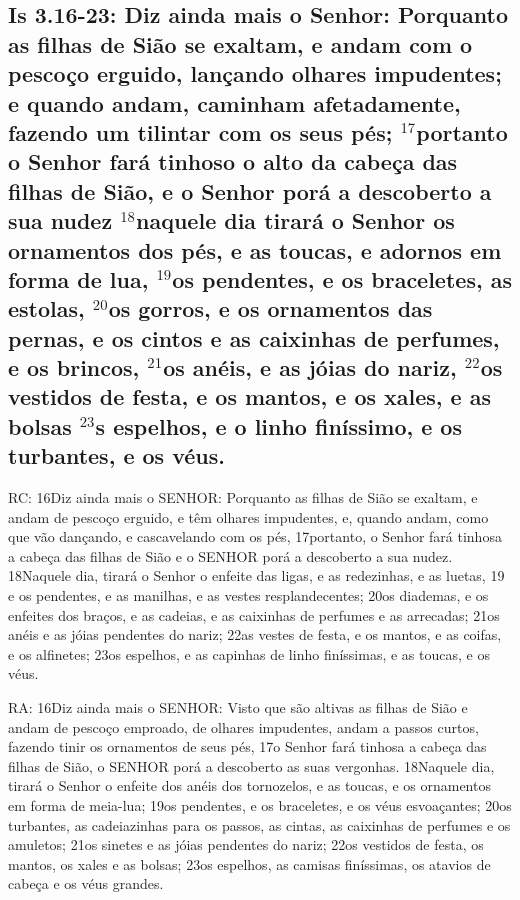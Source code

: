 \subsection{Is 3.16-23: Diz ainda mais o Senhor: Porquanto as filhas de Sião se exaltam, e andam com o pescoço erguido, lançando olhares impudentes; e quando andam, caminham afetadamente, fazendo um tilintar com os seus pés; $^{\mathrm{17}}$portanto o Senhor fará tinhoso o alto da cabeça das filhas de Sião, e o Senhor porá a descoberto a sua nudez\uwave{,} $^{\mathrm{18}}$naquele dia tirará o Senhor os ornamentos dos pés, e as toucas, e adornos em forma de lua, $^{\mathrm{19}}$os pendentes, e os braceletes, as estolas, $^{\mathrm{20}}$os gorros, e os ornamentos das pernas, e os cintos e as caixinhas de perfumes, e os brincos, $^{\mathrm{21}}$os anéis, e as jóias do nariz, $^{\mathrm{22}}$os vestidos de festa, e os mantos, e os xales, e as bolsas $^{\mathrm{23}}$s espelhos, e o linho finíssimo, e os turbantes, e os véus.}

RC: 16Diz ainda mais o SENHOR: Porquanto as filhas de Sião se exaltam, e andam de pescoço erguido, e têm olhares impudentes, e, quando andam, como que vão dançando, e cascavelando com os pés, 17portanto, o Senhor fará tinhosa a cabeça das filhas de Sião e o SENHOR porá a descoberto a sua nudez. 18Naquele dia, tirará o Senhor o enfeite das ligas, e as redezinhas, e as luetas, 19 e os pendentes, e as manilhas, e as vestes resplandecentes; 20os diademas, e os enfeites dos braços, e as cadeias, e as caixinhas de perfumes e as arrecadas; 21os anéis e as jóias pendentes do nariz; 22as vestes de festa, e os mantos, e as coifas, e os alfinetes; 23os espelhos, e as capinhas de linho finíssimas, e as toucas, e os véus.

RA: 16Diz ainda mais o SENHOR: Visto que são altivas as filhas de Sião e andam de pescoço emproado, de olhares impudentes, andam a passos curtos, fazendo tinir os ornamentos de seus pés, 17o Senhor fará tinhosa a cabeça das filhas de Sião, o SENHOR porá a descoberto as suas vergonhas. 18Naquele dia, tirará o Senhor o enfeite dos anéis dos tornozelos, e as toucas, e os ornamentos em forma de meia-lua; 19os pendentes, e os braceletes, e os véus esvoaçantes; 20os turbantes, as cadeiazinhas para os passos, as cintas, as caixinhas de perfumes e os amuletos; 21os sinetes e as jóias pendentes do nariz; 22os vestidos de festa, os mantos, os xales e as bolsas; 23os espelhos, as camisas finíssimas, os atavios de cabeça e os véus grandes.

